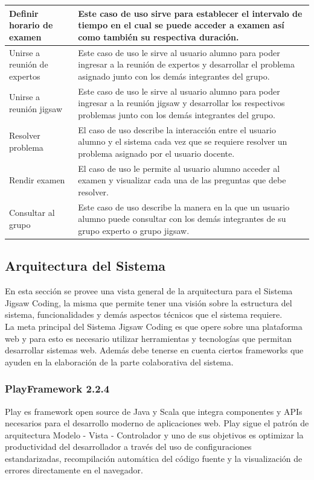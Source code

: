 \begin{longtable}{|L{4cm}|L{9cm}|}
	\hline
	Definir horario de examen & Este caso de uso sirve para establecer el intervalo de tiempo en el cual se puede acceder a examen así como también su respectiva duración.\\
	\hline
	Unirse a reunión de expertos & Este caso de uso le sirve al usuario alumno para poder ingresar a la reunión de expertos y desarrollar el problema asignado junto con los demás integrantes del grupo.\\
	\hline
	Unirse a reunión jigsaw & Este caso de uso le sirve al usuario alumno para poder ingresar a la reunión jigsaw y desarrollar los respectivos problemas junto con los demás integrantes del grupo. \\
	\hline
	Resolver problema & El caso de uso describe la interacción entre el usuario alumno y el sistema cada vez que se requiere resolver un problema asignado por el usuario docente.\\
	\hline
	Rendir examen & El caso de uso le permite al usuario alumno acceder al examen y visualizar cada una de las preguntas que debe resolver.\\
	\hline
	Consultar al grupo & Este caso de uso describe la manera en la que un usuario alumno puede consultar con los demás integrantes de su grupo experto o grupo jigsaw.\\
	\hline
\end{longtable}

\subsection{Arquitectura del Sistema}
En esta sección se provee una vista general de la arquitectura para el Sistema Jigsaw Coding, la misma que permite tener una visión sobre la estructura del sistema, funcionalidades y demás aspectos técnicos que el sistema requiere.\\

La meta principal del Sistema Jigsaw Coding es que opere sobre una plataforma web y para esto es necesario utilizar herramientas y tecnologías que permitan desarrollar sistemas web. Además debe tenerse en cuenta ciertos frameworks que ayuden en la elaboración de la parte colaborativa del sistema.

\subsubsection{PlayFramework 2.2.4}
Play es framework open source de Java y Scala que integra componentes y APIs necesarios para el desarrollo moderno de aplicaciones web. Play sigue el patrón de arquitectura Modelo - Vista - Controlador y uno de sus objetivos es optimizar la productividad del desarrollador a través del uso de configuraciones estandarizadas, recompilación automática del código fuente y la visualización de errores directamente en el navegador.

